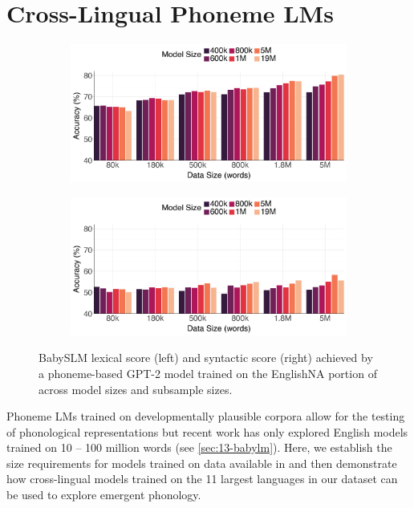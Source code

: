
\section{Cross-Lingual Phoneme LMs}\label{sec:13-phonemelms}

\begin{figure}[t]
\centering
\begin{subfigure}{0.45\linewidth}
    \includegraphics[width=\linewidth]{Figures/13Dataset/lexical.png}
\end{subfigure}
\hfill
\begin{subfigure}{0.45\linewidth}
    \includegraphics[width=\linewidth]{Figures/13Dataset/syntactic.png}
\end{subfigure}
\hfill
\caption{BabySLM lexical score (left) and syntactic score (right) achieved by a phoneme-based GPT-2 model trained on the EnglishNA portion of \ipachildes across model sizes and subsample sizes.}
\label{fig:13-babyslm}
\end{figure}

Phoneme LMs trained on developmentally plausible corpora allow for the testing of phonological representations but recent work has only explored English models trained on 10 -- 100 million words (see \cref{sec:13-babylm}). Here, we establish the size requirements for models trained on data available in \ipachildes and then demonstrate how cross-lingual models trained on the 11 largest languages in our dataset can be used to explore emergent phonology.

